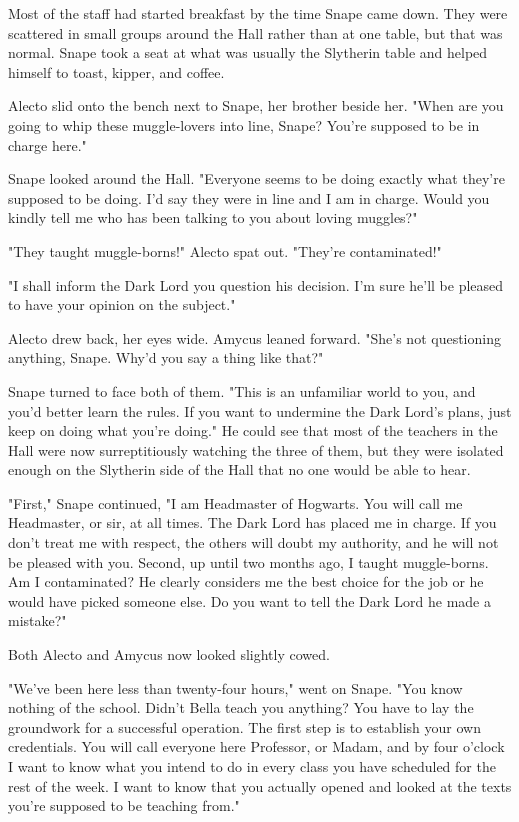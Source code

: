 Most of the staff had started breakfast by the time Snape came down. They were scattered in small groups around the Hall rather than at one table, but that was normal. Snape took a seat at what was usually the Slytherin table and helped himself to toast, kipper, and coffee.

Alecto slid onto the bench next to Snape, her brother beside her. "When are you going to whip these muggle-lovers into line, Snape? You're supposed to be in charge here."

Snape looked around the Hall. "Everyone seems to be doing exactly what they're supposed to be doing. I'd say they were in line and I am in charge. Would you kindly tell me who has been talking to you about loving muggles?"

"They taught muggle-borns!" Alecto spat out. "They're contaminated!"

"I shall inform the Dark Lord you question his decision. I'm sure he'll be pleased to have your opinion on the subject."

Alecto drew back, her eyes wide. Amycus leaned forward. "She's not questioning anything, Snape. Why'd you say a thing like that?"

Snape turned to face both of them. "This is an unfamiliar world to you, and you'd better learn the rules. If you want to undermine the Dark Lord's plans, just keep on doing what you're doing." He could see that most of the teachers in the Hall were now surreptitiously watching the three of them, but they were isolated enough on the Slytherin side of the Hall that no one would be able to hear.

"First," Snape continued, "I am Headmaster of Hogwarts. You will call me Headmaster, or sir, at all times. The Dark Lord has placed me in charge. If you don't treat me with respect, the others will doubt my authority, and he will not be pleased with you. Second, up until two months ago, I taught muggle-borns. Am I contaminated? He clearly considers me the best choice for the job or he would have picked someone else. Do you want to tell the Dark Lord he made a mistake?"

Both Alecto and Amycus now looked slightly cowed.

"We've been here less than twenty-four hours," went on Snape. "You know nothing of the school. Didn't Bella teach you anything? You have to lay the groundwork for a successful operation. The first step is to establish your own credentials. You will call everyone here Professor, or Madam, and by four o'clock I want to know what you intend to do in every class you have scheduled for the rest of the week. I want to know that you actually opened and looked at the texts you're supposed to be teaching from."


